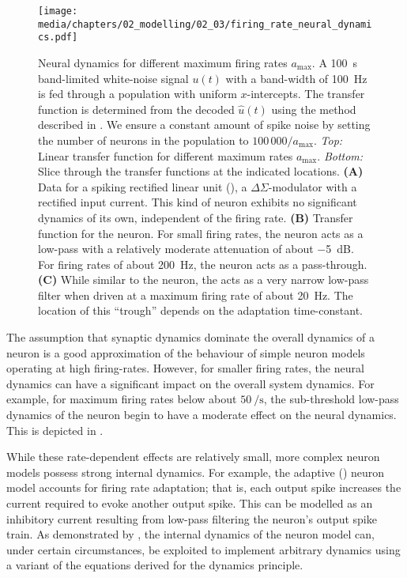\begin{figure}[t]
	\texttt{[image: media/chapters/02\_modelling/02\_03/firing\_rate\_neural\_dynamics.pdf]}
	\caption[Neural dynamics for different maximum firing rates]{Neural dynamics for different maximum firing rates $a_\mathrm{max}$. A \SI{100}{\second} band-limited white-noise signal $u(t)$ with a band-width of \SI{100}{\hertz} is fed through a \NEF population with uniform $x$-intercepts.
	The transfer function is determined from the decoded $\hat u(t)$ using the method described in \citet[Section~4.3.3]{eliasmith2003neural}.
	We ensure a constant amount of spike noise by setting the number of neurons in the population to $100\,000 / a_\mathrm{max}$. \emph{Top:} Linear transfer function for different maximum rates $a_\mathrm{max}$. \emph{Bottom:} Slice through the transfer functions at the indicated locations.
	\textbf{(A)} Data for a spiking rectified linear unit (\ReLU), a $\Delta\Sigma$-modulator with a rectified input current. This kind of neuron exhibits no significant dynamics of its own, independent of the firing rate. \textbf{(B)} Transfer function for the \LIF neuron. For small firing rates, the neuron acts as a low-pass with a relatively moderate attenuation of about \SI{-5}{\deci\bel}. For firing rates of about \SI{200}{\hertz}, the neuron acts as a pass-through. \textbf{(C)} While similar to the \LIF neuron, the \ALIF
	acts as a very narrow low-pass filter when driven at a maximum firing rate of about \SI{20}{\hertz}. The location of this \enquote{trough} depends on the adaptation time-constant.}
	\label{fig:neural_dynamics_firing_rates}
\end{figure}

The assumption that synaptic dynamics dominate the overall dynamics of a neuron is a good approximation of the behaviour of simple neuron models operating at high firing-rates.
However, for smaller firing rates, the neural dynamics can have a significant impact on the overall system dynamics.
For example, for maximum firing rates below about $\SI{50}{\per\second}$, the sub-threshold low-pass dynamics of the \LIF neuron begin to have a moderate effect on the neural dynamics.
This is depicted in .

While these rate-dependent effects are relatively small, more complex neuron models possess strong internal dynamics.
For example, the adaptive \LIF (\ALIF) neuron model \citep[Chapter~14]{koch1999biophysics} accounts for firing rate adaptation; that is, each output spike increases the current required to evoke another output spike.
This can be modelled as an inhibitory current resulting from low-pass filtering the neuron's output spike train.
As demonstrated by \citet[Chapter~7]{tripp2009search}, the internal dynamics of the \ALIF neuron model can, under certain circumstances, be exploited to implement arbitrary dynamics using a variant of the equations derived for the \NEF dynamics principle.

